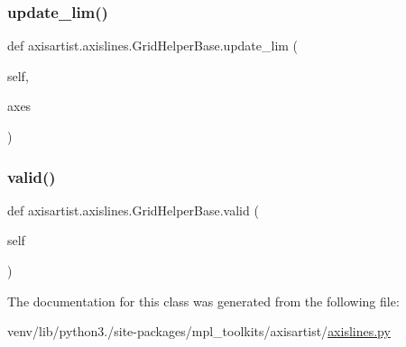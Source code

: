 \subsubsection{\texorpdfstring{update\+\_\+lim()}{update\_lim()}}
{\footnotesize\ttfamily def axisartist.\+axislines.\+Grid\+Helper\+Base.\+update\+\_\+lim (\begin{DoxyParamCaption}\item[{}]{self,  }\item[{}]{axes }\end{DoxyParamCaption})}

\mbox{\label{classaxisartist_1_1axislines_1_1GridHelperBase_a31dbd9b7691c0684055f70760c316412}} 
\subsubsection{\texorpdfstring{valid()}{valid()}}
{\footnotesize\ttfamily def axisartist.\+axislines.\+Grid\+Helper\+Base.\+valid (\begin{DoxyParamCaption}\item[{}]{self }\end{DoxyParamCaption})}



The documentation for this class was generated from the following file\+:\begin{DoxyCompactItemize}
\item 
venv/lib/python3./site-\/packages/mpl\+\_\+toolkits/axisartist/\hyperlink{axisartist_2axislines_8py}{axislines.\+py}\end{DoxyCompactItemize}
